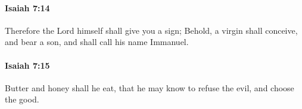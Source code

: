 		\paragraph{Isaiah 7:14} %
			\label{ISAIAH-7-14}

			Therefore the Lord himself shall give you a sign; Behold, a virgin shall conceive, and bear a son, and shall call his name Immanuel.


		\paragraph{Isaiah 7:15} %
			\label{ISAIAH-7-15}

			Butter and honey shall he eat, that he may know to refuse the evil, and choose the good.


